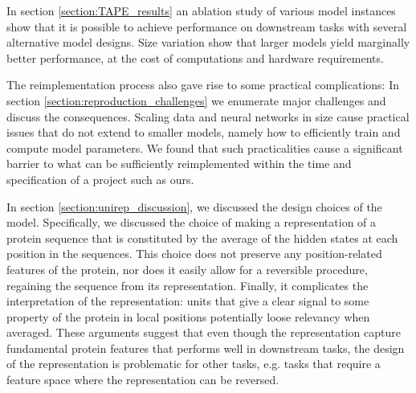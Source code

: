 \documentclass[a4paper,12pt]{article}
\begin{document}
In section \ref{section:TAPE_results} an ablation study of various model instances show that it is possible to achieve performance on downstream tasks with several alternative model designs. Size variation show that larger models yield marginally better performance, at the cost of computations and hardware requirements.

The reimplementation process also gave rise to some practical complications: In section \ref{section:reproduction_challenges} we enumerate major challenges and discuss the consequences. Scaling data and neural networks in size cause practical issues that do not extend to smaller models, namely how to efficiently train and compute model parameters. We found that such practicalities cause a significant barrier to what can be sufficiently reimplemented within the time and specification of a project such as ours.

In section \ref{section:unirep_discussion}, we discussed the design choices of the model. Specifically, we discussed the choice of making a representation of a protein sequence that is constituted by the average of the hidden states at each position in the sequences. This choice does not preserve any position-related features of the protein, nor does it easily allow for a reversible procedure, regaining the sequence from its representation. Finally, it complicates the interpretation of the representation: units that give a clear signal to some property of the protein in local positions potentially loose relevancy when averaged. These arguments suggest that even though the representation capture fundamental protein features that performs well in downstream tasks, the design of the representation is problematic for other tasks, e.g. tasks that require a feature space where the representation can be reversed.



\end{document}
